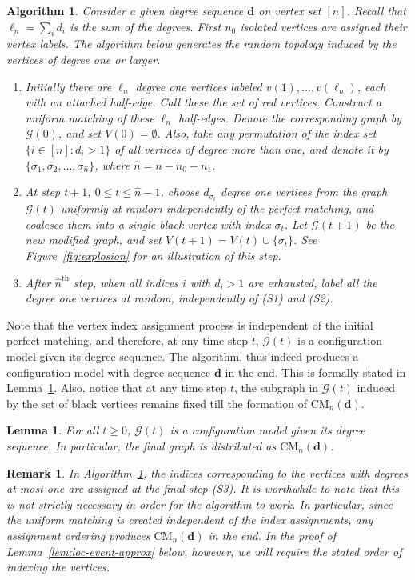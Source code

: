 \documentclass[11pt,a4paper, reqno]{article}
\numberwithin{equation}{section}
\numberwithin{equation}{section}
\newcommand{\1}{\ensuremath{\mathbbm{1}}}
\newcommand{\CM}{\ensuremath{\mathrm{CM}_n(\boldsymbol{d})}}
\newcommand{\bld}[1]{\boldsymbol{#1}}
\newtheorem{algo}{Algorithm}
\newtheorem{lemma}[theorem]{Lemma}
\newtheorem{remark}{Remark}
\numberwithin{equation}{section}
\numberwithin{theorem}{section}
\begin{document}
\begin{algo}\label{algo-CM}\normalfont 
Consider a given degree sequence $\bld{d}$ on vertex set $[n]$. Recall that $\ell_n = \sum_i d_i$ is the sum of the degrees. 
First $n_0$ isolated vertices are assigned their vertex labels. 
The algorithm below generates the random topology induced by the vertices of degree one or larger.
 \begin{enumerate}[(S1)]
  \item Initially there are $\ell_n$ degree one vertices  labeled $v(1),\dots,v(\ell_n)$, each with an attached half-edge. Call these the set of \emph{red} vertices. 
  Construct a uniform matching of these $\ell_n$ half-edges. 
  Denote the corresponding graph by $\mathcal{G}(0)$, and set $V(0)=\emptyset$.
  Also, take any permutation of the index set $\{i\in [n]:d_i>1\}$ of all vertices of degree more than one, and denote it by $\{\sigma_1,\sigma_2,\ldots,\sigma_{\hat{n}}\}$, where $\hat{n}=n-n_0-n_1$.
  \item At step $t+1$, $0\leq t\leq \hat{n}-1$, choose $d_{\sigma_t}$ degree one vertices from the graph $\mathcal{G}(t)$ uniformly at random independently of the perfect matching, and coalesce them into a single \emph{black} vertex with index $\sigma_t$. 
  Let $\mathcal{G}(t+1)$ be the new modified graph, and set $V(t+1)=V(t)\cup \{\sigma_t\}$. See Figure~\ref{fig:explosion} for an illustration of this step.
  \item After $\hat{n}^{\mathrm{th}}$ step, when all indices $i$ with $d_i>1$ are exhausted, label all the degree one vertices at random, independently of (S1) and (S2). 
 \end{enumerate}  
\end{algo}
Note that the vertex index assignment process is independent of the initial perfect matching, and therefore, at any time step $t$,  $\mathcal{G}(t)$ is a configuration model given its degree sequence.
The algorithm, thus indeed produces a configuration model with degree sequence $\bld{d}$ in the end.
This is formally stated in Lemma~\ref{lem:distn-alt-cons}.
Also,  notice that at any time step $t$,  the subgraph in $\mathcal{G}(t)$ induced by the set of black vertices remains fixed till the formation of $\CM$.
\begin{lemma}\label{lem:distn-alt-cons} 
For all $t\geq 0$,
$\mathcal{G}(t)$ is a configuration model given its degree sequence. In particular, the final graph is distributed as \CM.
\end{lemma}
\begin{remark}{\normalfont
In Algorithm~\ref{algo-CM}, the indices corresponding to the vertices with degrees at most one are assigned at the final step (S3).
It is worthwhile to note that this is not strictly necessary in order for the algorithm to work. 
In particular, since the uniform matching is created independent of the index assignments, any assignment ordering produces $\CM$ in the end.
In the proof of Lemma~\ref{lem:loc-event-approx} below, however, we will require the stated order of indexing the vertices.
}
\end{remark}
\end{document}
